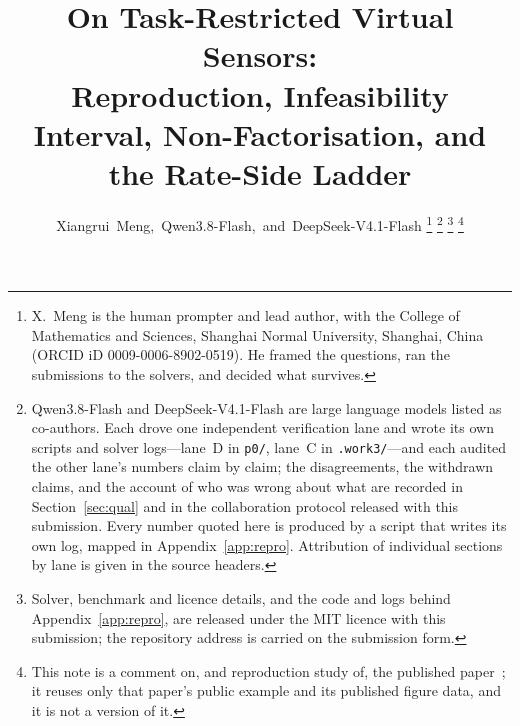 \documentclass[journal]{IEEEtran}
\theoremstyle{remark}
\begin{document}
\title{On Task-Restricted Virtual Sensors:\\
Reproduction, Infeasibility Interval, Non-Factorisation, and the Rate-Side Ladder}

\author{Xiangrui~Meng,~Qwen3.8-Flash,~and~DeepSeek-V4.1-Flash%
\thanks{X.~Meng is the human prompter and lead author, with the College of
Mathematics and Sciences, Shanghai Normal University, Shanghai, China
(ORCID iD 0009-0006-8902-0519). He framed the questions, ran the submissions to
the solvers, and decided what survives.}%
\thanks{Qwen3.8-Flash and DeepSeek-V4.1-Flash are large language models listed as
co-authors. Each drove one independent verification lane and wrote its own
scripts and solver logs---lane~D in \texttt{p0/}, lane~C in \texttt{.work3/}---and
each audited the other lane's numbers claim by claim; the disagreements, the
withdrawn claims, and the account of who was wrong about what are recorded in
Section~\ref{sec:qual} and in the collaboration protocol released with this
submission. Every number quoted here is produced by a script that writes its own
log, mapped in Appendix~\ref{app:repro}. Attribution of individual sections by
lane is given in the source headers.}%
\thanks{Solver, benchmark and licence details, and the code and logs behind
Appendix~\ref{app:repro}, are released under the MIT licence with this
submission; the repository address is carried on the submission form.}%
\thanks{This note is a comment on, and reproduction study of, the published
paper~\cite{refpaper}; it reuses only that paper's public example and its
published figure data, and it is not a version of it.}}

\maketitle
\end{document}
